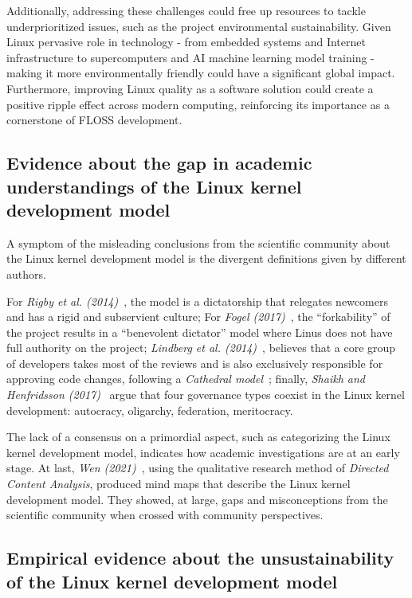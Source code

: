 Additionally, addressing these challenges could free up resources to tackle underprioritized issues, such as the project environmental sustainability. Given Linux pervasive role in technology - from embedded systems and Internet infrastructure to supercomputers and AI machine learning model training - making it more environmentally friendly could have a significant global impact. Furthermore, improving Linux quality as a software solution could create a positive ripple effect across modern computing, reinforcing its importance as a cornerstone of FLOSS development.

\subsection{Evidence about the gap in academic understandings of the Linux kernel development model}

A symptom of the misleading conclusions from the scientific community about the Linux kernel development model is the divergent definitions given by different authors.

For \textit{Rigby et al. (2014)}~\cite{rigby2014-peer-review}, the model is a dictatorship that relegates newcomers and has a rigid and subservient culture; For \textit{Fogel (2017)}~\cite{fogel2017-producing-oss}, the ``forkability'' of the project results in a ``benevolent dictator'' model where Linus does not have full authority on the project; \textit{Lindberg et al. (2014)}~\cite{lindberg2014-theorizing}, believes that a core group of developers takes most of the reviews and is also exclusively responsible for approving code changes, following a \textit{Cathedral model}~\cite{raymond1999-cathedral}; finally, \textit{Shaikh and Henfridsson (2017)}~\cite{shaikh2017-governing-oss} argue that four governance types coexist in the Linux kernel development: autocracy, oligarchy, federation, meritocracy.

The lack of a consensus on a primordial aspect, such as categorizing the Linux kernel development model, indicates how academic investigations are at an early stage. At last, \textit{Wen (2021)}~\cite{wen2021-masterthesis}, using the qualitative research method of \textit{Directed Content Analysis}, produced mind maps that describe the Linux kernel development model. They showed, at large, gaps and misconceptions from the scientific community when crossed with community perspectives. 

\subsection{Empirical evidence about the unsustainability of the Linux kernel development model}

